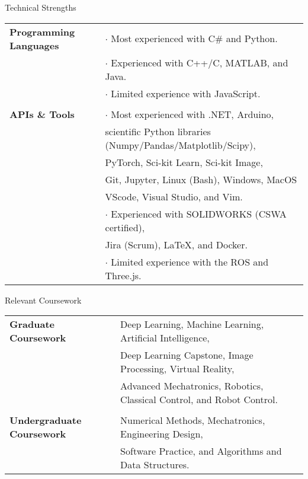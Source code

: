 \documentclass{resume}
\begin{document}
  \begin{rSection}{Technical Strengths}
    \begin{tabular}{ @{} >{\bfseries}l @{\hspace{3ex}} l }
      Programming Languages
      & $\cdot$ Most experienced with C\# and Python. \\
      & $\cdot$ Experienced with C++/C, MATLAB, and Java. \\
      & $\cdot$ Limited experience with JavaScript. \\
      
      & \\

      APIs \& Tools 
      & $\cdot$ Most experienced with .NET, Arduino, \\ 
      & \phantom{$\cdot$} scientific Python libraries (Numpy/Pandas/Matplotlib/Scipy), \\
      & \phantom{$\cdot$} PyTorch, Sci-kit Learn, Sci-kit Image, \\
      & \phantom{$\cdot$} Git, Jupyter, Linux (Bash), Windows, MacOS \\
      & \phantom{$\cdot$} VScode, Visual Studio, and Vim. \\
      & $\cdot$ Experienced with SOLIDWORKS (CSWA certified), \\ 
      & \phantom{$\cdot$} Jira (Scrum), LaTeX, and Docker.\\
      & $\cdot$ Limited experience with the ROS and Three.js. \\
    \end{tabular}
  \end{rSection}
  
  \begin{rSection}{Relevant Coursework}
    \begin{tabular}{ @{} >{\bfseries}l @{\hspace{1ex}} l }
      Graduate Coursework
      & Deep Learning, Machine Learning, Artificial Intelligence, \\
      & Deep Learning Capstone, Image Processing, Virtual Reality,\\
      & Advanced Mechatronics, Robotics, Classical Control, and Robot Control.\\

      & \\

      Undergraduate Coursework
      & Numerical Methods, Mechatronics, Engineering Design, \\
      & Software Practice, and Algorithms and Data Structures. \\
    \end{tabular}
  \end{rSection}
\end{document}
